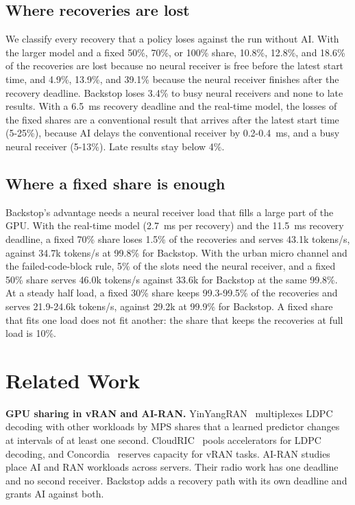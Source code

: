 \documentclass[acmsmall,screen,review,anonymous]{acmart}
\newcommand{\sys}{Backstop\xspace}
\begin{document}
\subsection{Where recoveries are lost}

We classify every recovery that a policy loses against the run without AI. With the larger model and a
fixed 50\%, 70\%, or 100\% share, 10.8\%, 12.8\%, and 18.6\% of the recoveries are lost because no neural
receiver is free before the latest start time, and 4.9\%, 13.9\%, and 39.1\% because the neural receiver
finishes after the recovery deadline. \sys loses 3.4\% to busy neural receivers and none to late results.
With a 6.5~ms recovery deadline and the real-time model, the losses of the fixed shares are a conventional
result that arrives after the latest start time (5-25\%), because AI delays the conventional receiver by
0.2-0.4~ms, and a busy neural receiver (5-13\%). Late results stay below 4\%.

\subsection{Where a fixed share is enough}

\sys's advantage needs a neural receiver load that fills a large part of the GPU. With the real-time model
(2.7~ms per recovery) and the 11.5~ms recovery deadline, a fixed 70\% share loses 1.5\% of the recoveries
and serves 43.1k tokens/s, against 34.7k tokens/s at 99.8\% for \sys. With the urban micro channel and the
failed-code-block rule, 5\% of the slots need the neural receiver, and a fixed 50\% share serves 46.0k
tokens/s against 33.6k for \sys at the same 99.8\%. At a steady half load, a fixed 30\% share keeps
99.3-99.5\% of the recoveries and serves 21.9-24.6k tokens/s, against 29.2k at 99.9\% for \sys. A fixed share
that fits one load does not fit another: the share that keeps the recoveries at full load is 10\%.

\section{Related Work}

\noindent\textbf{GPU sharing in vRAN and AI-RAN.} YinYangRAN~\cite{yinyangran} multiplexes LDPC decoding
with other workloads by MPS shares that a learned predictor changes at intervals of at least one second.
CloudRIC~\cite{cloudric} pools accelerators for LDPC decoding, and Concordia~\cite{concordia} reserves
capacity for vRAN tasks. AI-RAN studies~\cite{interplay,caora,haf,distributedairan} place AI and RAN
workloads across servers. Their radio work has one deadline and no second receiver. \sys adds a recovery
path with its own deadline and grants AI against both.
\end{document}
